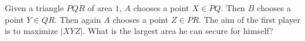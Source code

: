 Given a triangle $PQR$ of area $1$, $A$ chooses a point $X \in PQ$. Then $B$ chooses a point $Y \in QR$. Then again $A$ chooses a point $Z \in PR$. The aim of the first player is to maximize $|XYZ|$. What is the largest area he can secure for himself?
